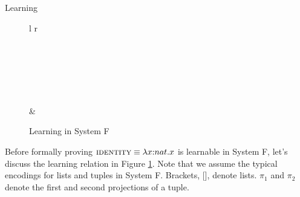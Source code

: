 \documentclass[11pt]{article}
\newcommand{\lam}{\lambda}
\theoremstyle{mytheoremstyle}
\begin{document}
\begin{section}{Learning}
\begin{figure}[h!]
\begin{tabular}{l r}
{        \DisplayProof
    } \\\\
     \\\\
     \\\\
     \\
    & \\
\specialrule{.1em}{1em}{0em}
\end{tabular}
\caption{Learning in System F}
    \label{fig:learning}
\end{figure}

Before formally proving $\textsc{identity} \equiv \lam x{:}nat.x$ is learnable in System F, let's discuss the learning relation in Figure \ref{fig:learning}. Note that we assume the typical encodings for lists and tuples in System F. Brackets, [], denote lists. $\pi_1$ and $\pi_2$ denote the first and second projections of a tuple.


\end{section}
\end{document}
